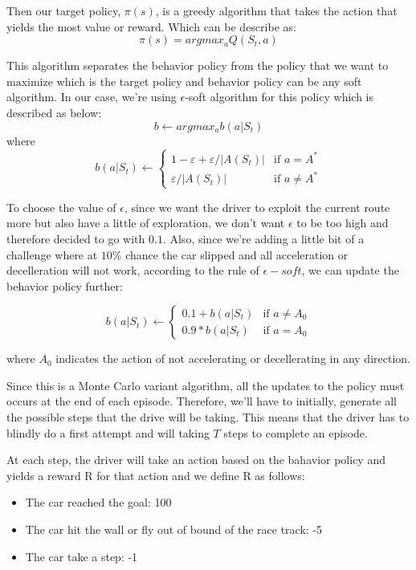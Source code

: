 \documentclass{article}
\begin{document}
Then our target policy, $\pi(s)$, is a greedy algorithm that takes the action that yields the most value or reward. 
Which can be describe as:
\[
  \pi(s) = argmax_aQ(S_t, a)
\]

This algorithm separates the behavior policy from the policy that we want to
maximize which is the target policy and behavior policy can be any soft
algorithm. In our case, we're using $\epsilon$-soft algorithm for this policy
which is described as below:
\[
  b \leftarrow argmax_ab(a|S_t)
\]
where 
\[
  b(a|S_t) \leftarrow \left\{
\begin{array}{ll}
1-\varepsilon+\varepsilon/|A(S_t)| & \text{if } a = A^* \\
\varepsilon/|A(S_t)| & \text{if } a \neq A^*
\end{array}
\right.
\]

To choose the value of $\epsilon$, since we want the driver to exploit the current
route more but also have a little of exploration, we don't want $\epsilon$ to be
too high and therefore decided to go with $0.1$. Also, since we're adding a
little bit of a challenge where at $10\%$ chance the car slipped and all
acceleration or decelleration will not work, according to the rule of
$\epsilon-soft$, we can update the behavior policy further:

\[
  b(a|S_t) \leftarrow \left\{
\begin{array}{ll}
0.1+b(a|S_t) & \text{if } a \neq A_0  \\
0.9*b(a|S_t) & \text{if } a = A_0
\end{array}
\right.
\]

where $A_0$ indicates the action of not accelerating or decellerating in any
direction.

Since this is a Monte Carlo variant algorithm, all the updates to the policy
must occurs at the end of each episode. Therefore, we'll have to initially,
generate all the possible steps that the drive will be taking. This means that
the driver has to blindly do a first attempt and will taking $T$ steps to
complete an episode. 

At each step, the driver will take an action based on the bahavior policy and
yields a reward R for that action and we define R as follows:
\begin{itemize}
  \item The car reached the goal: 100
  \item The car hit the wall or fly out of bound of the race track: -5
  \item The car take a step: -1
\end{itemize}
\end{document}
